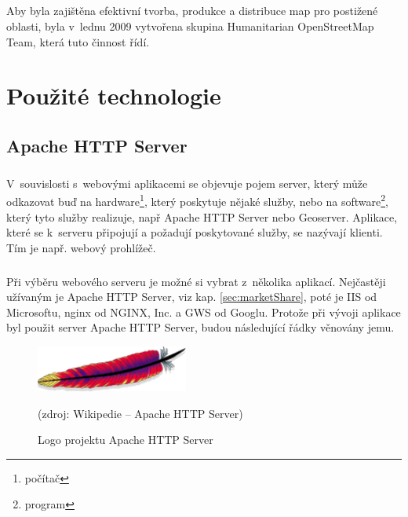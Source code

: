 \documentclass[11pt,a4paper,titlepage,oneside]{book}
\begin{document}
		\paragraph{} Aby byla zajištěna efektivní tvorba, produkce a distribuce map pro postižené oblasti, byla v~lednu 2009 vytvořena skupina Humanitarian OpenStreetMap Team\cite{wiki_hot}, která tuto činnost řídí.
	

\chapter{Použité technologie}

	\section{Apache HTTP Server}

		\paragraph{}\label{sec:server} V~souvislosti s~webovými aplikacemi se objevuje pojem server, který může odkazovat buď na hardware\footnote{počítač}, který poskytuje nějaké služby, nebo na software\footnote{program}, který tyto služby realizuje, např Apache HTTP Server nebo Geoserver. Aplikace, které se k~serveru připojují a požadují poskytované služby, se nazývají klienti\label{sec:klient}. Tím je např. webový prohlížeč.
		\paragraph{} Při výběru webového serveru je možné si vybrat z~několika aplikací. Nejčastěji užívaným je Apache HTTP Server, viz kap. \ref{sec:marketShare}, poté je IIS od Microsoftu, nginx od NGINX, Inc. a GWS od Googlu. Protože při vývoji aplikace byl použit server Apache HTTP Server, budou následující řádky věnovány jemu.
		\begin{figure}[!h]
			\begin{center}
				\includegraphics[width=5cm]{obrazky/apacheLogo.png}
				\caption{Logo projektu Apache HTTP Server}
				(zdroj: Wikipedie -- Apache HTTP Server\cite{wiki-Apache})
			\end{center}
		\end{figure}
\end{document}
